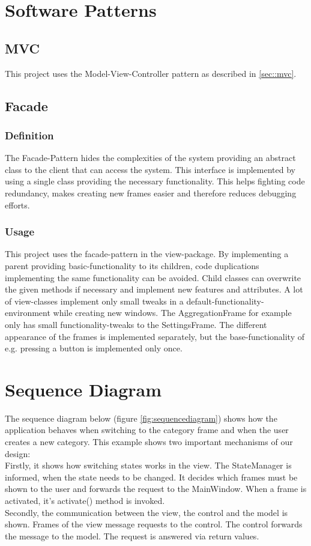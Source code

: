 \documentclass[parskip=full]{report} %
\begin{document}
\chapter{Software Patterns}

\section{MVC}
This project uses the Model-View-Controller pattern as described in \ref{sec::mvc}.

\section{Facade}
\subsection{Definition}
The Facade-Pattern hides the complexities of the system providing an abstract class to the client that can access the system. This interface is implemented by using a single class providing the necessary functionality. This helps fighting code redundancy, makes creating new frames easier and therefore reduces debugging efforts.
\subsection{Usage}
This project uses the facade-pattern in the view-package. By implementing a parent providing basic-functionality to its children, code duplications implementing the same functionality can be avoided. Child classes can overwrite the given methods if necessary and implement new features and attributes.
A lot of view-classes implement only small tweaks in a default-functionality-environment while creating new windows. The AggregationFrame for example only has small functionality-tweaks to the SettingsFrame. The different appearance of the frames is implemented separately, but the base-functionality of e.g. pressing a button is implemented only once.


\chapter{Sequence Diagram}
The sequence diagram below (figure \ref{fig:sequencediagram}) shows how the application behaves when switching to the category frame and when the user creates a new category. This example shows two important mechanisms of our design:\\
Firstly, it shows how switching states works in the view. The StateManager is informed, when the state needs to be changed. It decides which frames must be shown to the user and forwards the request to the MainWindow. When a frame is activated, it's activate() method is invoked. \\
Secondly, the communication between the view, the control and the model is shown. Frames of the view message requests to the control. The control forwards the message to the model. The request is answered via return values.
\end{document}
